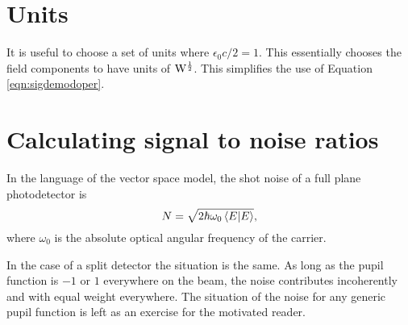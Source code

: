 \section{Units}
It is useful to choose a set of units where $\epsilon_0 c/2=1$. %
This essentially chooses the field components to have units of $\rm{W}^{\frac{1}{2}}$. %
This simplifies the use of Equation \ref{eqn:sigdemodoper}.

\section{Calculating signal to noise ratios}
In the language of the vector space model, the shot noise of a full plane photodetector is 
\begin{equation}
N=\sqrt{2\hbar \omega_0 \inprod{E}{E}},
\end{equation}
where $\omega_0$ is the absolute optical angular frequency of the carrier.

In the case of a split detector the situation is the same. %
As long as the pupil function is $-1$ or $1$ everywhere on the beam, the noise contributes incoherently and with equal weight everywhere. %
The situation of the noise for any generic pupil function is left as an exercise for the motivated reader.
